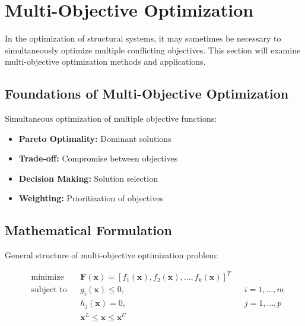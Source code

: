 \section{Multi-Objective Optimization}
In the optimization of structural systems, it may sometimes be necessary to simultaneously optimize multiple conflicting objectives. This section will examine multi-objective optimization methods and applications. 

\subsection{Foundations of Multi-Objective Optimization}
Simultaneous optimization of multiple objective functions:

\begin{tcolorbox}[title=Basic Concepts]
\begin{itemize}
    \item \textbf{Pareto Optimality:} Dominant solutions
    \item \textbf{Trade-off:} Compromise between objectives
    \item \textbf{Decision Making:} Solution selection
    \item \textbf{Weighting:} Prioritization of objectives
\end{itemize}
\end{tcolorbox}

\subsection{Mathematical Formulation}
General structure of multi-objective optimization problem:

\begin{equation}
\begin{aligned}
& \text{minimize} & & \mathbf{F}(\mathbf{x}) = [f_1(\mathbf{x}), f_2(\mathbf{x}), \ldots, f_k(\mathbf{x})]^T \\
& \text{subject to} & & g_i(\mathbf{x}) \leq 0, & & i = 1,\ldots,m \\
& & & h_j(\mathbf{x}) = 0, & & j = 1,\ldots,p \\
& & & \mathbf{x}^L \leq \mathbf{x} \leq \mathbf{x}^U
\end{aligned}
\end{equation}

